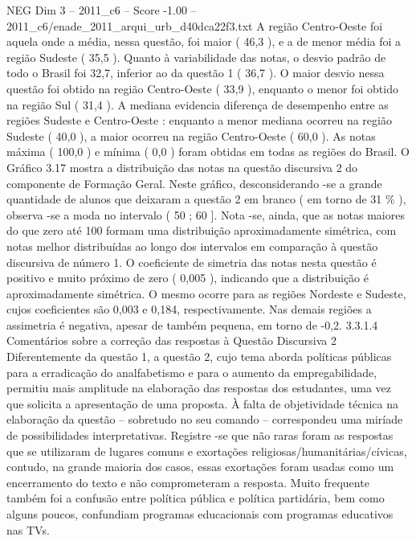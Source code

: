\begin{textsample}{NEG Dim 3 – 2011\_c6 – Score -1.00 – 2011\_c6/enade\_2011\_arqui\_urb\_d40dca22f3.txt}
A região Centro-Oeste foi aquela onde a média, nessa questão, foi maior ( 46,3 ), e a de menor média foi a região Sudeste ( 35,5 ).
Quanto à variabilidade das notas, o desvio padrão de todo o Brasil foi 32,7, inferior ao da questão 1 ( 36,7 ).
O maior desvio nessa questão foi obtido na região Centro-Oeste ( 33,9 ), enquanto o menor foi obtido na região Sul ( 31,4 ).
A mediana evidencia diferença de desempenho entre as regiões Sudeste e Centro-Oeste : enquanto a menor mediana ocorreu na região Sudeste ( 40,0 ), a maior ocorreu na região Centro-Oeste ( 60,0 ).
As notas máxima ( 100,0 ) e mínima ( 0,0 ) foram obtidas em todas as regiões do Brasil.
O Gráfico 3.17 mostra a distribuição das notas na questão discursiva 2 do componente de Formação Geral.
Neste gráfico, desconsiderando -se a grande quantidade de alunos que deixaram a questão 2 em branco ( em torno de 31 \% ), observa -se a moda no intervalo ( 50 ; 60 ].
Nota -se, ainda, que as notas maiores do que zero até 100 formam uma distribuição aproximadamente simétrica, com notas melhor distribuídas ao longo dos intervalos em comparação à questão discursiva de número 1.
O coeficiente de simetria das notas nesta questão é positivo e muito próximo de zero ( 0,005 ), indicando que a distribuição é aproximadamente simétrica.
O mesmo ocorre para as regiões Nordeste e Sudeste, cujos coeficientes são 0,003 e 0,184, respectivamente.
Nas demais regiões a assimetria é negativa, apesar de também pequena, em torno de -0,2. 3.3.1.4 Comentários sobre a correção das respostas à Questão Discursiva 2 Diferentemente da questão 1, a questão 2, cujo tema aborda políticas públicas para a erradicação do analfabetismo e para o aumento da empregabilidade, permitiu mais amplitude na elaboração das respostas dos estudantes, uma vez que solicita a apresentação de uma proposta.
À falta de objetividade técnica na elaboração da questão – sobretudo no seu comando – correspondeu uma miríade de possibilidades interpretativas.
Registre -se que não raras foram as respostas que se utilizaram de lugares comuns e exortações religiosas/humanitárias/cívicas, contudo, na grande maioria dos casos, essas exortações foram usadas como um encerramento do texto e não comprometeram a resposta.
Muito frequente também foi a confusão entre política pública e política partidária, bem como alguns poucos, confundiam programas educacionais com programas educativos nas TVs.

\end{textsample}
